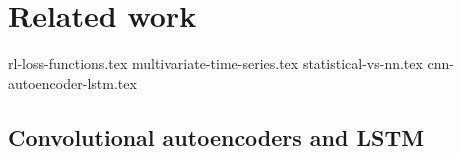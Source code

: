 
\chapter{Related work}\label{RelatedWorkMain}

{rl-loss-functions.tex}
{multivariate-time-series.tex}
{statistical-vs-nn.tex}
{cnn-autoencoder-lstm.tex}
\section{Convolutional autoencoders and LSTM}
